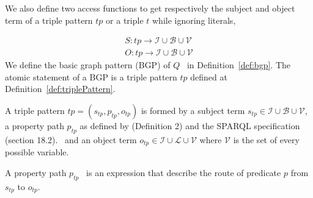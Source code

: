 We also define two access functions to get respectively the subject and object term of a triple pattern $tp$ or a triple $t$ while ignoring literals,

\begin{equation}
    \begin{aligned}
        S: tp \rightarrow \mathcal{I} \cup \mathcal{B} \cup \mathcal{V} \\
        O: tp \rightarrow \mathcal{I} \cup \mathcal{B} \cup \mathcal{V}
    \end{aligned}
 \end{equation}
\iffalse
We define the basic graph pattern (BGP) of $Q$~ in Definition~\ref{def:bgp}.
The atomic statement of a BGP is a triple pattern $tp$ defined at Definition~\ref{def:triplePattern}.

\begin{definition}\label{def:triplePattern}
    A triple pattern $tp = (s_{tp},p_{tp},o_{tp})$ is formed by a subject term $s_{tp} \in \mathcal{I} \cup \mathcal{B} \cup \mathcal{V}$, 
    a property path  $p_{tp}$ as defined by  \citeauthor{Kostylev2015} (Definition 2) and the SPARQL specification (section 18.2).~ 
    and an object term  $o_{tp} \in \mathcal{I} \cup \mathcal{L} \cup \mathcal{V}$ 
    where $\mathcal{V}$ is the set of every possible variable. 
\end{definition}

\begin{definition}\label{def:propertyPath}
   A property path $p_{tp}$~\cite{Kostylev2015} is an expression that describe the route of predicate $p$ from $s_{tp}$ to $o_{tp}$.
   \iffalse
   A property path in $tp$ is defined as follow:
   \begin{equation}
    p_{tp} ::= p \in \mathcal{I} | (p_{tpi}/p_{tpj}) | (p_{tpi}|p_{tpj}) | p_{tpi}* | p_{tpi}+ | p_{tpi}? | !p_{tpi}| p_{tpi}^{-}
   \end{equation}.
   The "$/$" operator chain two property path, the alternative operator "$|$" define a possibility between $p_{tpi}$ and $p_{tpj}$.
   The "$^-$" operator inverse the path from $s_{tp}$ to $o_{tp}$.
   The "$!$" represent the negation of a path $p_{tpi}$ such as $p_{tpi} = \mathcal{I} \setminus p_{tpi}$.
   The "$*$", "$+$" and "$?$", refered to in this paper as \emph{cardinality property paths}, are respectively; the repetition of 0 and more of $p_{tpi}$, 
   the repetition of 1 and more of $p_{tpi}$ and the presence or absence of $p_{tpi}$.
   \fi
\end{definition}

